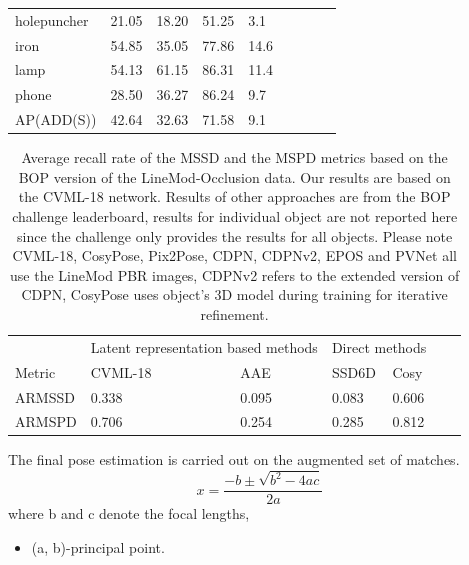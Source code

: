 \documentclass[9pt,a4paper,twoside]{tau}
\begin{document}
\begin{table}[H]
\begin{tabular}{lllllllll}
holepuncher & 21.05              & 18.20            & 51.25             & 3.1           \\
iron        & 54.85              & 35.05            & 77.86             & 14.6          \\
lamp        & 54.13              & 61.15            & 86.31             & 11.4          \\
phone       & 28.50              & 36.27            & 86.24             & 9.7           \\
AP(ADD(S))  & 42.64              & 32.63            & 71.58             & 9.1           
\end{tabular}
    \end{table}
    \begin{table}[H]
        \centering
        \caption{Average recall rate of the MSSD and the MSPD metrics based on the BOP version of the LineMod-Occlusion data. Our results are based on the CVML-18 network. Results of other approaches are from the BOP challenge leaderboard, results for individual object are not reported here since the challenge only provides the results for all objects. Please note CVML-18, CosyPose, Pix2Pose, CDPN, CDPNv2, EPOS and PVNet all use the LineMod PBR images, CDPNv2 refers to the extended version of CDPN, CosyPose uses object’s 3D model during training for iterative refinement.}
    \label{tab:table}

\begin{tabular}{lllllll}
       & \multicolumn{2}{c}{Latent representation based methods} & \multicolumn{2}{c}{Direct methods}\\
Metric & CVML-18                & AAE                & SSD6D          & Cosy\\
ARMSSD & 0.338                  & 0.095              & 0.083          & 0.606\\
ARMSPD & 0.706                  & 0.254              & 0.285          & 0.812           
\end{tabular}      
    \end{table}

The final pose estimation is carried out on the augmented set of matches.
\begin{equation} \label{eq:dis}
            x= \frac{-b \pm \sqrt{b^2 - 4ac}}{2a}
        \end{equation}
where b and c denote the focal lengths,
\begin{itemize}
        \item (a, b)-principal point.
        \end{itemize}
\end{document}
